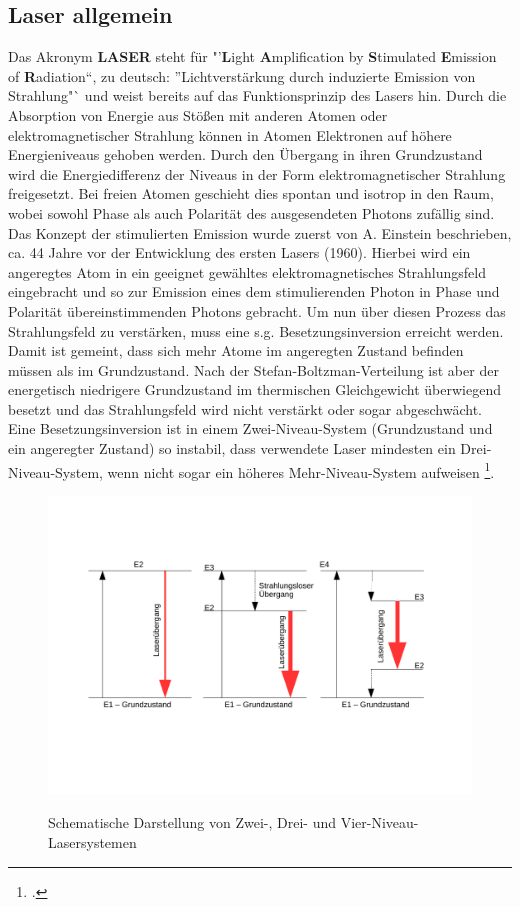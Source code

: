 \documentclass[twoside,colorback,accentcolor=tud4c,11pt]{tudreport}
\begin{document}
\subsection{Laser allgemein}
Das Akronym  \textbf{LASER} steht für "'\textbf{L}ight \textbf{A}mplification by \textbf{S}timulated \textbf{E}mission of \textbf{R}adiation"`, zu deutsch: "'Lichtverstärkung durch induzierte Emission von Strahlung"` und weist bereits auf das Funktionsprinzip des Lasers hin. Durch die Absorption von Energie aus Stößen mit anderen Atomen oder elektromagnetischer Strahlung können in Atomen Elektronen auf höhere Energieniveaus gehoben werden. Durch den Übergang in ihren Grundzustand wird die Energiedifferenz der Niveaus in der Form elektromagnetischer Strahlung freigesetzt. Bei freien Atomen geschieht dies spontan und isotrop in den Raum, wobei sowohl Phase als auch Polarität des ausgesendeten Photons zufällig sind.\\
Das Konzept der stimulierten Emission wurde zuerst von A. Einstein beschrieben, ca. 44 Jahre vor der Entwicklung des ersten Lasers (1960). Hierbei wird ein angeregtes Atom in ein geeignet gewähltes elektromagnetisches Strahlungsfeld eingebracht und so zur Emission eines dem stimulierenden Photon in Phase und Polarität übereinstimmenden Photons gebracht. Um nun über diesen Prozess das Strahlungsfeld zu verstärken, muss eine s.g. Besetzungsinversion erreicht werden. Damit ist gemeint, dass sich mehr Atome im angeregten Zustand befinden müssen als im Grundzustand. Nach der Stefan-Boltzman-Verteilung ist aber der energetisch niedrigere Grundzustand im thermischen Gleichgewicht überwiegend besetzt und das Strahlungsfeld wird nicht verstärkt oder sogar abgeschwächt. Eine Besetzungsinversion ist in einem Zwei-Niveau-System (Grundzustand und ein angeregter Zustand) so instabil, dass verwendete Laser mindesten ein Drei-Niveau-System, wenn nicht sogar ein höheres Mehr-Niveau-System aufweisen \footcite{prot1}.\\
\begin{figure}[H]
\centering
   	\begin{minipage}[b]{0.9\textwidth}
   	\includegraphics[width=\textwidth]{graphics/Lasersys.pdf}
  	\label{lasys}
   	\end{minipage}
\caption{Schematische Darstellung von Zwei-, Drei- und Vier-Niveau-Lasersystemen} 	
\end{figure}
\end{document}
